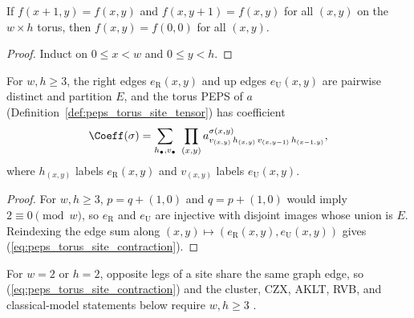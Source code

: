 \begin{lemma}%
    \label{lem:peps_torus_shift_const}
    \leanok
    If $f(x+1,y)=f(x,y)$ and $f(x,y+1)=f(x,y)$ for all $(x,y)$ on the $w\times h$
    torus, then $f(x,y)=f(0,0)$ for all $(x,y)$.
\end{lemma}

\begin{proof}\leanok
    Induct on $0\le x<w$ and $0\le y<h$.
\end{proof}

\begin{lemma}%
    \label{lem:peps_torus_site_tensor_contraction}
    \leanok
    For $w,h\ge 3$, the right edges $e_{\mathrm R}(x,y)$ and up edges
    $e_{\mathrm U}(x,y)$ are pairwise distinct and partition $E$, and the torus
    PEPS of $a$ (Definition~\ref{def:peps_torus_site_tensor}) has coefficient
    \begin{align}
        \Coeff(\sigma)=\sum_{h_\bullet,v_\bullet}\ \prod_{(x,y)}
        a^{\sigma(x,y)}_{v_{(x,y)}\,h_{(x,y)}\,v_{(x,y-1)}\,h_{(x-1,y)}},
        \label{eq:peps_torus_site_contraction}
    \end{align}
    where $h_{(x,y)}$ labels $e_{\mathrm R}(x,y)$ and $v_{(x,y)}$ labels
    $e_{\mathrm U}(x,y)$.
\end{lemma}

\begin{proof}\leanok
    For $w,h\ge 3$, $p=q+(1,0)$ and $q=p+(1,0)$ would imply $2\equiv 0\pmod w$,
    so $e_{\mathrm R}$ and $e_{\mathrm U}$ are injective with disjoint images
    whose union is $E$. Reindexing the edge sum along
    $(x,y)\mapsto(e_{\mathrm R}(x,y),e_{\mathrm U}(x,y))$ gives
    (\ref{eq:peps_torus_site_contraction}).
\end{proof}

For $w=2$ or $h=2$, opposite legs of a site share the same graph edge, so
(\ref{eq:peps_torus_site_contraction}) and the cluster, CZX, AKLT, RVB, and
classical-model statements below require $w,h\ge 3$
\cite{gap:rmp_peps_examples_small_torus}.

